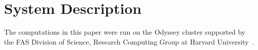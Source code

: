 \section{System Description}

The computations in this paper were run on the Odyssey cluster supported by the
FAS Division of Science, Research Computing Group at Harvard
University~\cite{odyssey}.
